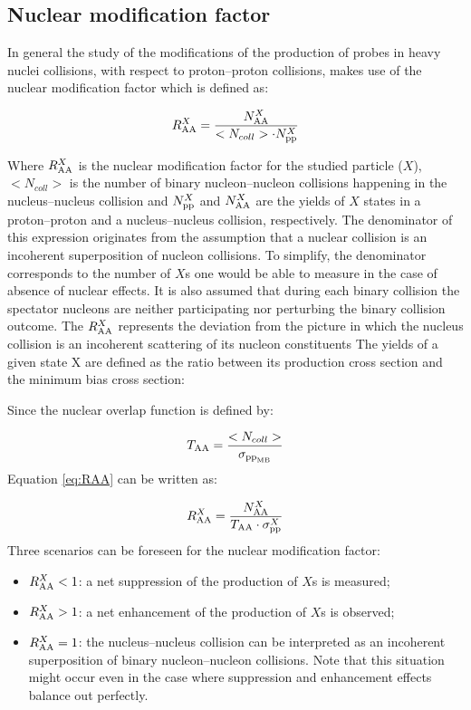 \subsection{Nuclear modification factor}\label{RAA}
In general the study of the modifications of the production of probes in heavy nuclei collisions, with respect to proton--proton collisions, makes use of the nuclear modification factor which is defined as:

\begin{equation}
\label{eq:RAA}
R_{\rm{AA}}^X = \frac{N_{\rm{AA}}^X}{<N_{coll}>\cdot N_{\rm{pp}}^X}
\end{equation}

Where $R_{\rm{AA}}^X$ is the nuclear modification factor for the studied particle ($X$), $<N_{coll}>$ is the number of binary nucleon--nucleon collisions happening in the nucleus--nucleus collision and $N_{\rm{pp}}^X$ and $N_{\rm{AA}}^X$ are the yields of $X$ states in a proton--proton and a nucleus--nucleus collision, respectively.
The denominator of this expression originates from the assumption that a nuclear collision is an incoherent superposition of nucleon collisions.
To simplify, the denominator corresponds to the number of $X$s one would be able to measure in the case of absence of nuclear effects.
It is also assumed that during each binary collision the spectator nucleons are neither participating nor perturbing the binary collision outcome.
The $R_{\rm{AA}}^X$ represents the deviation from the picture in which the nucleus collision is an incoherent scattering of its nucleon constituents
The yields of a given state X are defined as the ratio between its production cross section and the minimum bias cross section:


Since the nuclear overlap function is defined by:

\begin{equation}
\label{eq:TAA}
T_{\rm{AA}} = \frac{<N_{coll}>}{\sigma_{\rm{pp}_{MB}}}
\end{equation}
Equation \ref{eq:RAA} can be written as:

\begin{equation}
\label{eq:RAA2}
R_{\rm{AA}}^X = \frac{N_{\rm{AA}}^X}{T_{\rm{AA}} \cdot \sigma_{\rm{pp}}^X}
\end{equation}
Three scenarios can be foreseen for the nuclear modification factor:
\begin{itemize}
\item $R_{\rm{AA}}^X<1$: a net suppression of the production of $X$s is measured;
\item $R_{\rm{AA}}^X>1$: a net enhancement of the production of $X$s is observed; 
\item $R_{\rm{AA}}^X=1$: the nucleus--nucleus collision can be interpreted as an incoherent superposition of binary nucleon--nucleon collisions. Note that this situation might occur even in the case where suppression and enhancement effects balance out perfectly.
\end{itemize}

